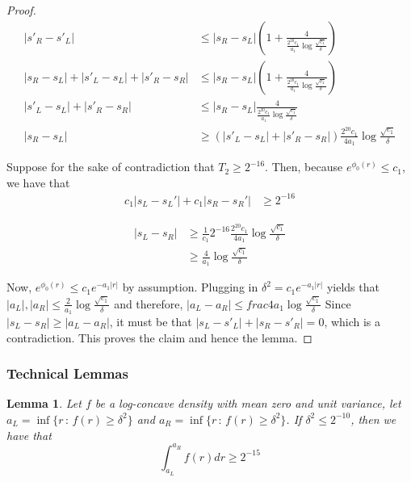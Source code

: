 \documentclass[12pt]{article}
\newtheorem{lemma}[theorem]{Lemma}
\begin{document}
\begin{proof}
  \begin{align*}
    |s'_R - s'_L| &\leq  |s_R - s_L| \left( 1 + \frac{4}{\frac{2^{20} c_1}{a_1} \log \frac{\sqrt{c_1}}{\delta}} \right)\\
    |s_R - s_L| + |s'_L - s_L| + |s'_R - s_R| &\leq |s_R - s_L|
                                                \left( 1 + \frac{4}{\frac{2^{20} c_1}{a_1} \log \frac{\sqrt{c_1}}{\delta}} \right)\\
    |s'_L - s_L| + |s'_R - s_R| &\leq |s_R - s_L| \frac{4}{\frac{2^{20} c_1}{a_1} \log \frac{\sqrt{c_1}}{\delta}} \\
        |s_R - s_L| & \geq (|s'_L - s_L| + |s'_R - s_R|) \frac{2^{20} c_1}{4 a_1} \log \frac{\sqrt{c_1}}{\delta}
  \end{align*}
                                   
  Suppose for the sake of contradiction that $T_2 \geq 2^{-16}$. Then, because $e^{\phi_0(r)} \leq c_1$, we have that
  \begin{align*}
    c_1 | s_L - s_L'| + c_1 | s_R - s_R'| &\geq 2^{-16}
  \end{align*}

  \begin{align*}    
    |s_L - s_R| &\geq \frac{1}{c_1} 2^{-16} \frac{2^{20} c_1}{4 a_1} \log \frac{\sqrt{c_1}}{\delta} \\
                &\geq \frac{4}{a_1} \log \frac{\sqrt{c_1}}{\delta}
  \end{align*}

  Now, $e^{\phi_0(r)} \leq c_1 e^{- a_1 |r|}$ by assumption. Plugging in $\delta^2 = c_1 e^{- a_1 |r|}$ yields that $|a_L|, |a_R| \leq \frac{2}{a_1} \log \frac{\sqrt{c_1}}{\delta}$ and therefore, $|a_L - a_R| \leq frac{4}{a_1} \log \frac{\sqrt{c_1}}{\delta}$
  Since $|s_L - s_R| \geq |a_L - a_R|$, it must be that $|s_L - s'_L| + |s_R - s'_R| = 0$, which is a contradiction. This proves the claim and hence the lemma.
  
\end{proof}

\subsubsection{Technical Lemmas}

\begin{lemma}
  \label{lem:log_concave_central_mass}
  Let $f$ be a log-concave density with mean zero and unit variance, let $a_L = \inf \{ r \,:\, f(r) \geq \delta^2\}$ and $a_R = \inf \{ r \,:\, f(r) \geq \delta^2\}$. If $\delta^2 \leq 2^{-10}$, then we have that
  \[
    \int_{a_L}^{a_R} f(r) dr \geq 2^{-15}
  \]
\end{lemma}
\end{document}
